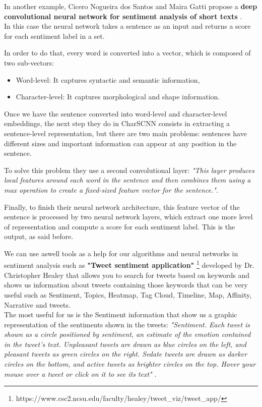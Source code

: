 \documentclass[12pt,twoside]{article}
\theoremstyle{plain}
\theoremstyle{definition}
\theoremstyle{remark}
\begin{document}
		In another example, Cicero Nogueira dos Santos and Maira Gatti propose a \textbf{deep convolutional neural network for sentiment analysis of short texts} \cite{glorot2011domain}.\\
		
		In this case the neural network takes a sentence as an input and returns a score for each sentiment label in a set. 
		
		In order to do that, every word is converted into a vector, which is composed of two sub-vectors:
		
		\begin{itemize}
			\item Word-level: It captures syntactic and semantic information,
			\item Character-level: It captures morphological and shape information.
		\end{itemize}
	
		Once we have the sentence converted into word-level and character-level embeddings, the next step they do in CharSCNN consists in extracting a sentence-level representation, but there are two main problems: sentences have different sizes and important information can appear at any position in the sentence. 
		
		To solve this problem they use a second convolutional layer: \textit{"This layer produces local features around each word in the sentence and then combines them using a max operation to create a fixed-sized feature vector for the sentence."\cite{glorot2011domain}}.
		
		Finally, to finish their neural network architecture, this feature vector of the sentence is processed by two neural network layers, which extract one more level of representation and compute a score for each sentiment label. This is the output, as said before.
		
		
		We can use aswell tools as a help for our algorithms and neural networks in sentiment analysis such as \textbf{"Tweet sentiment application"} \footnote{https://www.csc2.ncsu.edu/faculty/healey/tweet\_viz/tweet\_app/} developed by Dr. Christopher Healey that allows you to search for tweets based on keywords and shows us information about tweets containing those keywords that can be very useful such as Sentiment, Topics, Heatmap, Tag Cloud, Timeline, Map, Affinity, Narrative and tweets. \\
		
		The most useful for us is the Sentiment information that show us a graphic representation of the sentiments shown in the tweets: \textit{"Sentiment. Each tweet is shown as a circle positioned by sentiment, an estimate of the emotion contained in the tweet's text. Unpleasant tweets are drawn as blue circles on the left, and pleasant tweets as green circles on the right. Sedate tweets are drawn as darker circles on the bottom, and active tweets as brighter circles on the top. Hover your mouse over a tweet or click on it to see its text"} \cite{tweet_sentiment_analysis}.
		
\end{document}
